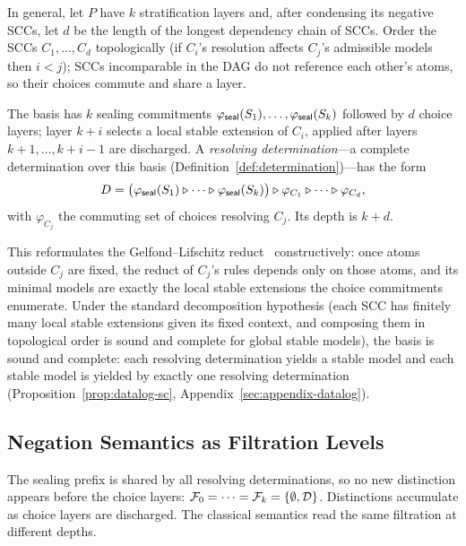 In general, let $P$ have $k$ stratification layers and, after condensing its
negative SCCs, let $d$ be the length of the longest dependency chain of SCCs.
Order the SCCs $C_1, \dots, C_d$ topologically (if $C_i$'s resolution affects
$C_j$'s admissible models then $i < j$); SCCs incomparable in the DAG do not
reference each other's atoms, so their choices commute and share a layer.

\begin{definition}
  \label{def:datalog-canonical}
  The basis has $k$ sealing commitments
  $\varphi_{\mathsf{seal}}(S_1), \dots, \varphi_{\mathsf{seal}}(S_k)$ followed by $d$ choice
    layers; layer $k{+}i$ selects a local stable extension of $C_i$, applied
    after layers $k{+}1,\dots,k{+}i{-}1$ are discharged. A \emph{resolving
    determination}---a complete determination over this basis
    (Definition~\ref{def:determination})---has the form
  \[
    D = \bigl(\varphi_{\mathsf{seal}}(S_1) \mathbin{\triangleright} \cdots \mathbin{\triangleright} \varphi_{\mathsf{seal}}(S_k)\bigr)
        \mathbin{\triangleright} \varphi_{C_1} \mathbin{\triangleright} \cdots \mathbin{\triangleright} \varphi_{C_d},
  \]
  with $\varphi_{C_j}$ the commuting set of choices resolving $C_j$. Its depth
  is $k + d$.
\end{definition}

\noindent
This reformulates the Gelfond--Lifschitz reduct~\cite{gelfond1988stable}
constructively: once atoms outside $C_j$ are fixed, the reduct of $C_j$'s
rules depends only on those atoms, and its minimal models are exactly the
local stable extensions the choice commitments enumerate. Under the standard
decomposition hypothesis (each SCC has finitely many local stable extensions
given its fixed context, and composing them in topological order is sound and
complete for global stable models), the basis is sound and complete: each
resolving determination yields a stable model and each stable model is yielded
by exactly one resolving determination
(Proposition~\ref{prop:datalog-sc}, Appendix~\ref{sec:appendix-datalog}).

\subsection{Negation Semantics as Filtration Levels}
\label{sec:datalog-filtration}

The sealing prefix is shared by all resolving determinations, so no new
distinction appears before the choice layers:
$\mathcal{F}_0 = \cdots = \mathcal{F}_k = \{\emptyset, \mathcal{D}\}$. Distinctions
accumulate as choice layers are discharged. The classical semantics read the
same filtration at different depths.

